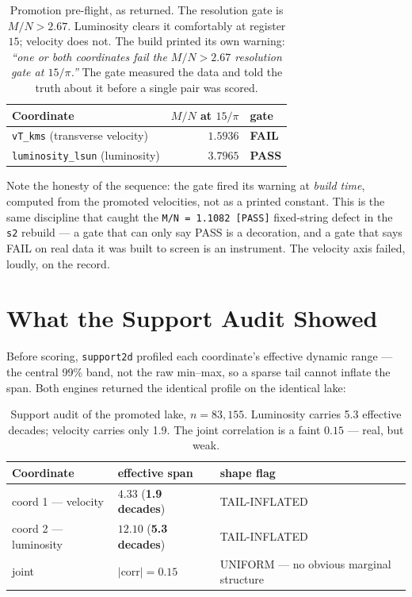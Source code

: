 \documentclass[11pt, letterpaper, openany]{book}
\begin{document}
\begin{table}[H]
\centering
\small
\begin{tabular}{@{}lrl@{}}
\toprule
\textbf{Coordinate} & \textbf{$M/N$ at $15/\pi$} & \textbf{gate} \\
\midrule
\texttt{vT\_kms} (transverse velocity) & $1.5936$ & \textbf{\color{signalred}FAIL} \\
\texttt{luminosity\_lsun} (luminosity) & $3.7965$ & \textbf{\color{signalgreen}PASS} \\
\bottomrule
\end{tabular}
\caption{Promotion pre-flight, as returned. The resolution gate is $M/N > 2.67$. Luminosity
clears it comfortably at register $15$; velocity does not. The build printed its own warning:
\emph{``one or both coordinates fail the $M/N > 2.67$ resolution gate at $15/\pi$.''} The gate
measured the data and told the truth about it before a single pair was scored.}
\end{table}

\begin{correctionbox}
Note the honesty of the sequence: the gate fired its warning at \emph{build time}, computed from
the promoted velocities, not as a printed constant. This is the same discipline that caught the
\texttt{M/N = 1.1082 [PASS]} fixed-string defect in the \texttt{s2} rebuild --- a gate that can
only say PASS is a decoration, and a gate that says FAIL on real data it was built to screen is an
instrument. The velocity axis failed, loudly, on the record.
\end{correctionbox}

\section{What the Support Audit Showed}

Before scoring, \texttt{support2d} profiled each coordinate's effective dynamic range --- the
central 99\% band, not the raw min--max, so a sparse tail cannot inflate the span. Both engines
returned the identical profile on the identical lake:

\begin{table}[H]
\centering
\small
\begin{tabular}{@{}lll@{}}
\toprule
\textbf{Coordinate} & \textbf{effective span} & \textbf{shape flag} \\
\midrule
coord 1 --- velocity & $4.33$ \; (\textbf{1.9 decades}) & TAIL-INFLATED \\
coord 2 --- luminosity & $12.10$ \; (\textbf{5.3 decades}) & TAIL-INFLATED \\
joint & $|\mathrm{corr}| = 0.15$ & UNIFORM --- no obvious marginal structure \\
\bottomrule
\end{tabular}
\caption{Support audit of the promoted lake, $n = 83{,}155$. Luminosity carries 5.3 effective
decades; velocity carries only 1.9. The joint correlation is a faint $0.15$ --- real, but weak.}
\end{table}
\end{document}
